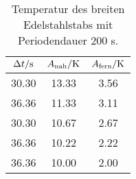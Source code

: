 \begin{table}

	\centering

	\caption{Temperatur des breiten Edelstahlstabs mit Periodendauer 200 s.}


	\begin{tabular}{S[table-format=3.2] S[table-format=3.2]S[table-format=3.2]}

		\toprule

		{$\Delta t/\si[per-mode=reciprocal]{\second}$}&{$A_\text{nah}/\si[per-mode=reciprocal]{\kelvin}$}&{$A_\text{fern}/\si[per-mode=reciprocal]{\kelvin}$} \\

		\midrule

		30.30 & 13.33 & 3.56 \\

		36.36 & 11.33 & 3.11 \\

		30.30 & 10.67 & 2.67 \\

		36.36 & 10.22 & 2.22 \\

		36.36 & 10.00 & 2.00 \\

		\bottomrule

	\end{tabular}

	\label{tab:tab4}

\end{table}
